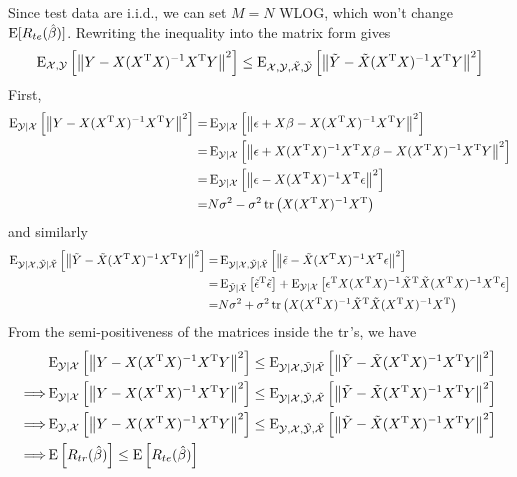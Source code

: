 \begin{sol}
Since test data are i.i.d., we can set $M=N$ WLOG, which won't change $\operatorname{E}[R_{te}(\hat{\beta})]$. Rewriting the inequality into the matrix form gives
\[
\operatorname{E}_{\mathcal{X},\mathcal{Y}}\left[\left\|Y-X(X^{\mathrm{T}}X)^{-1}X^{\mathrm{T}}Y\right\|^2\right] \le \operatorname{E}_{\mathcal{X},\mathcal{Y},\tilde{\mathcal{X}},\tilde{\mathcal{Y}}}\left[\left\|\tilde{Y}-\tilde{X}(X^{\mathrm{T}}X)^{-1}X^{\mathrm{T}}Y\right\|^2\right]
\]
First,
\begin{align*}
\operatorname{E}_{\mathcal{Y}\vert \mathcal{X}}\left[\left\|Y-X(X^{\mathrm{T}}X)^{-1}X^{\mathrm{T}}Y\right\|^2\right] =& \operatorname{E}_{\mathcal{Y}\vert \mathcal{X}}\left[\left\|\epsilon+X\beta-X(X^{\mathrm{T}}X)^{-1}X^{\mathrm{T}}Y\right\|^2\right] \\
=& \operatorname{E}_{\mathcal{Y}\vert \mathcal{X}}\left[\left\|\epsilon+X(X^{\mathrm{T}}X)^{-1}X^{\mathrm{T}}X\beta-X(X^{\mathrm{T}}X)^{-1}X^{\mathrm{T}}Y\right\|^2\right]\\
=& \operatorname{E}_{\mathcal{Y}\vert \mathcal{X}}\left[\left\|\epsilon-X(X^{\mathrm{T}}X)^{-1}X^{\mathrm{T}}\epsilon\right\|^2\right] \\
=& N\sigma^2-\sigma^2\operatorname{tr}\left(X(X^{\mathrm{T}}X)^{-1}X^{\mathrm{T}}\right)
\end{align*}
and similarly
\begin{align*}
\operatorname{E}_{\mathcal{Y}\vert \mathcal{X},\tilde{\mathcal{Y}}\vert \tilde{\mathcal{X}}}\left[\left\|\tilde{Y}-\tilde{X}(X^{\mathrm{T}}X)^{-1}X^{\mathrm{T}}Y\right\|^2\right] =& \operatorname{E}_{\mathcal{Y}\vert \mathcal{X},\tilde{\mathcal{Y}}\vert \tilde{\mathcal{X}}}\left[\left\|\tilde{\epsilon}-\tilde{X}(X^{\mathrm{T}}X)^{-1}X^{\mathrm{T}}\epsilon\right\|^2\right] \\
=& \operatorname{E}_{\tilde{\mathcal{Y}}\vert \tilde{\mathcal{X}}}\left[\tilde{\epsilon}^{\mathrm{T}}\tilde{\epsilon}\right] + \operatorname{E}_{\mathcal{Y}\vert \mathcal{X}}\left[\epsilon^{\mathrm{T}}X(X^{\mathrm{T}}X)^{-1}\tilde{X}^{\mathrm{T}}\tilde{X}(X^{\mathrm{T}}X)^{-1}X^{\mathrm{T}}\epsilon\right] \\
=& N\sigma^2+\sigma^2\operatorname{tr}\left(X(X^{\mathrm{T}}X)^{-1}\tilde{X}^{\mathrm{T}}\tilde{X}(X^{\mathrm{T}}X)^{-1}X^{\mathrm{T}}\right)
\end{align*}
From the semi-positiveness of the matrices inside the $\operatorname{tr}$'s, we have
\begin{align*}
& \operatorname{E}_{\mathcal{Y}\vert \mathcal{X}}\left[\left\|Y-X(X^{\mathrm{T}}X)^{-1}X^{\mathrm{T}}Y\right\|^2\right]
\le
\operatorname{E}_{\mathcal{Y}\vert \mathcal{X},\tilde{\mathcal{Y}}\vert \tilde{\mathcal{X}}}\left[\left\|\tilde{Y}-\tilde{X}(X^{\mathrm{T}}X)^{-1}X^{\mathrm{T}}Y\right\|^2\right]\\
\Longrightarrow& 
\operatorname{E}_{\mathcal{Y}\vert \mathcal{X}}\left[\left\|Y-X(X^{\mathrm{T}}X)^{-1}X^{\mathrm{T}}Y\right\|^2\right]
\le
\operatorname{E}_{\mathcal{Y}\vert \mathcal{X},\tilde{\mathcal{Y}}, \tilde{\mathcal{X}}}\left[\left\|\tilde{Y}-\tilde{X}(X^{\mathrm{T}}X)^{-1}X^{\mathrm{T}}Y\right\|^2\right] \\
\Longrightarrow& 
\operatorname{E}_{\mathcal{Y}, \mathcal{X}}\left[\left\|Y-X(X^{\mathrm{T}}X)^{-1}X^{\mathrm{T}}Y\right\|^2\right]
\le
\operatorname{E}_{\mathcal{Y}, \mathcal{X},\tilde{\mathcal{Y}}, \tilde{\mathcal{X}}}\left[\left\|\tilde{Y}-\tilde{X}(X^{\mathrm{T}}X)^{-1}X^{\mathrm{T}}Y\right\|^2\right] \\
\Longrightarrow& \operatorname{E}\left[R_{tr}(\hat{\beta})\right] \le \operatorname{E}\left[R_{te}(\hat{\beta})\right]
\end{align*}
\end{sol}
